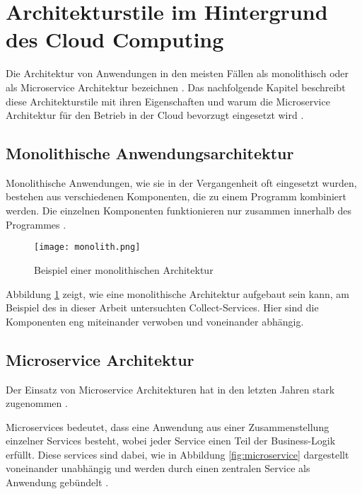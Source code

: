 \section{Architekturstile im Hintergrund des Cloud Computing}
Die Architektur von Anwendungen in den meisten Fällen als monolithisch oder als Microservice Architektur bezeichnen \cite[Vgl.][S. 150]{Gos2020}. Das nachfolgende Kapitel beschreibt diese Architekturstile mit ihren Eigenschaften und warum die Microservice Architektur für den Betrieb in der Cloud bevorzugt eingesetzt wird \cite[Vgl.][S. 1]{Villamizar2015}.

\subsection{Monolithische Anwendungsarchitektur}
Monolithische Anwendungen, wie sie in der Vergangenheit oft eingesetzt wurden, bestehen aus verschiedenen Komponenten, die zu einem Programm kombiniert werden. Die einzelnen Komponenten funktionieren nur zusammen innerhalb des Programmes \cite[Vgl.][S. 1]{Gos2020}.

\begin{figure}[H]
    \centering
    \texttt{[image: monolith.png]}
    \caption{Beispiel einer monolithischen Architektur \cite[Nachbildung angelehnt an][S. 150]{Gos2020}}
    \label{fig:monolith}
\end{figure}

Abbildung \ref{fig:monolith} zeigt, wie eine monolithische Architektur aufgebaut sein kann, am Beispiel des in dieser Arbeit untersuchten Collect-Services. Hier sind die Komponenten eng miteinander verwoben und voneinander abhängig.
\pagebreak

\subsection{Microservice Architektur}
Der Einsatz von Microservice Architekturen hat in den letzten Jahren stark zugenommen \cite[Vgl.][S. 150]{Gos2020}.

Microservices bedeutet, dass eine Anwendung aus einer Zusammenstellung einzelner Services besteht, wobei jeder Service einen Teil der Business-Logik erfüllt. Diese services sind dabei, wie in Abbildung \ref{fig:microservice} dargestellt voneinander unabhängig und werden durch einen zentralen Service als Anwendung gebündelt \cite[Vgl.][S. 150]{Gos2020}\cite[Vgl.][]{Janssen2021}\cite[Vgl.][]{Fowler2014}.

